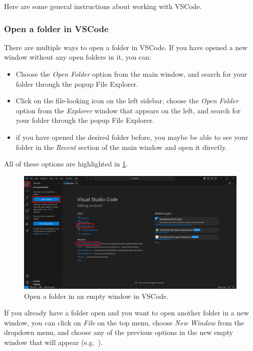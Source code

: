 \documentclass[a4paper,10pt]{article}
\begin{document}
Here are some general instructions about working with VSCode.

\subsubsection{Open a folder in VSCode}

There are multiple ways to open a folder in VSCode. If you have opened a new window without any open folders in it, you can:
\begin{itemize}
    \item Choose the \emph{Open Folder} option from the main window, and search for your folder through the popup File Explorer.
    \item Click on the file-looking icon on the left sidebar, choose the \emph{Open Folder} option from the \emph{Explorer} window that appears on the left, and search for your folder through the popup File Explorer.
    \item if you have opened the desired folder before, you maybe be able to see your folder in the \emph{Recent} section of the main window and open it directly.
\end{itemize}
All of these options are highlighted in \cref{fig:vscode_open_folder_1}.

\begin{figure}[htbp]
    \centering
    \includegraphics[width=\textwidth]{vscode_open_folder_1.png}
    \caption{Open a folder in an empty window in VSCode.}
    \label{fig:vscode_open_folder_1}   
\end{figure}

If you already have a folder open and you want to open another folder in a new window, you can click on \emph{File} on the top menu, choose \emph{New Window} from the dropdown menu, and choose any of the previous options in the new empty window that will appear (e.g.\ ).
\end{document}
